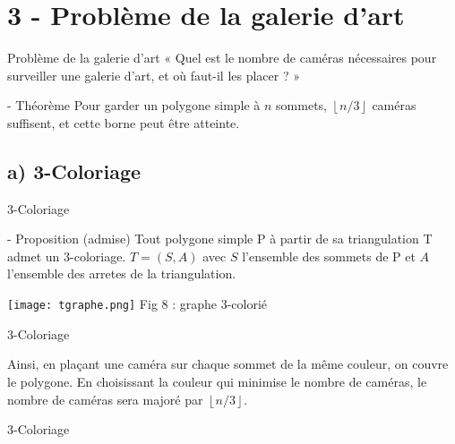 \documentclass{beamer}
\begin{document}
\section{3 - Problème de la galerie d'art}
\begin{frame}{Problème de la galerie d'art}
    « Quel est le nombre de caméras nécessaires pour surveiller une galerie d'art, et où faut-il les placer ? » \newline\newline
    \begin{block}{- Théorème}
      Pour garder un polygone simple à $n$ sommets,  $\left \lfloor {n/3} \right \rfloor$ caméras suffisent, et cette borne peut être atteinte.
    \end{block}
\end{frame}
\subsection{a) 3-Coloriage}
\begin{frame}{3-Coloriage}
    \begin{block}{- Proposition (admise)}
      Tout polygone simple P à partir de sa triangulation T admet un 3-coloriage. $T = (S,A)$ avec $S$ l'ensemble des sommets de P et $A$ l'ensemble des arretes de la triangulation.
      \begin{center}
        \texttt{[image: tgraphe.png]}
        Fig 8 : graphe 3-colorié
    \end{center}
  \end{block}
\end{frame}
\begin{frame}{3-Coloriage}
    \begin{center}
         Ainsi, en plaçant une caméra sur chaque sommet de la même couleur, on couvre le polygone. En choisissant la couleur qui minimise le nombre de caméras, le nombre de caméras sera majoré par $\left \lfloor {n/3} \right \rfloor$.
    \end{center}
\end{frame}
\begin{frame}{3-Coloriage}
\begin{center}
\end{center}
\end{frame}
\end{document}
